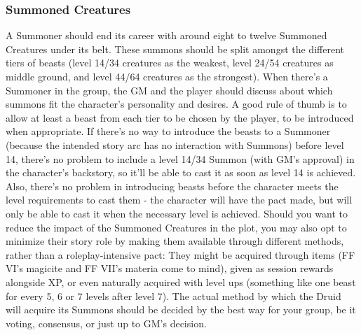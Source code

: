 \begin{multicols}{2}
\subsubsection{Summoned Creatures}\label{subsubsec:gm-summons}
A Summoner should end its career with around eight to twelve Summoned Creatures under its belt. These summons should be split amongst the different tiers of beasts (level 14/34 creatures as the weakest, level 24/54 creatures as middle ground, and level 44/64 creatures as the strongest). When there's a Summoner in the group, the GM and the player should discuss about which summons fit the character's personality and desires. A good rule of thumb is to allow at least a beast from each tier to be chosen by the player, to be introduced when appropriate. If there's no way to introduce the beasts to a Summoner (because the intended story arc has no interaction with Summons) before level 14, there's no problem to include a level 14/34 Summon (with GM's approval) in the character's backstory, so it'll be able to cast it as soon as level 14 is achieved. Also, there's no problem in introducing beasts before the character meets the level requirements to cast them - the character will have the pact made, but will only be able to cast it when the necessary level is achieved. Should you want to reduce the impact of the Summoned Creatures in the plot, you may also opt to minimize their story role by making them available through different methods, rather than a roleplay-intensive pact: They might be acquired through items (FF VI's magicite and FF VII's materia come to mind), given as session rewards alongside XP, or even naturally acquired with level ups (something like one beast for every 5, 6 or 7 levels after level 7). The actual method by which the Druid will acquire its Summons should be decided by the best way for your group, be it voting, consensus, or just up to GM's decision.

\begin{center}
\end{center}


\end{multicols}
